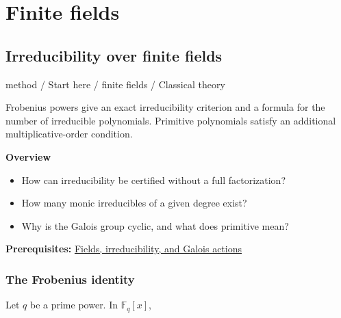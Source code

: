 \documentclass[11pt,a4paper,oneside,openany]{book}
\begin{document}
\part{Finite fields}
\chapter{Irreducibility over finite fields}\label{article:finite-field-irreducibility}\hypertarget{article:finite-field-irreducibility}{}\color{black}
{\sffamily\small\color{atlasgold}method / Start here / finite fields / Classical theory}\par\medskip
Frobenius powers give an exact irreducibility criterion and a formula for the number of irreducible polynomials. Primitive polynomials satisfy an additional multiplicative-order condition.\par\medskip
\textbf{Overview}\begin{itemize}
\item How can irreducibility be certified without a full factorization?
\item How many monic irreducibles of a given degree exist?
\item Why is the Galois group cyclic, and what does primitive mean?
\end{itemize}
{\small\textbf{Prerequisites:} \hyperlink{article:foundations}{Fields, irreducibility, and Galois actions}}\par
{}\section{The Frobenius identity}
\color{black} Let \(q\) be a prime power. In \(\mathbb F_q[x]\),\par
\end{document}

